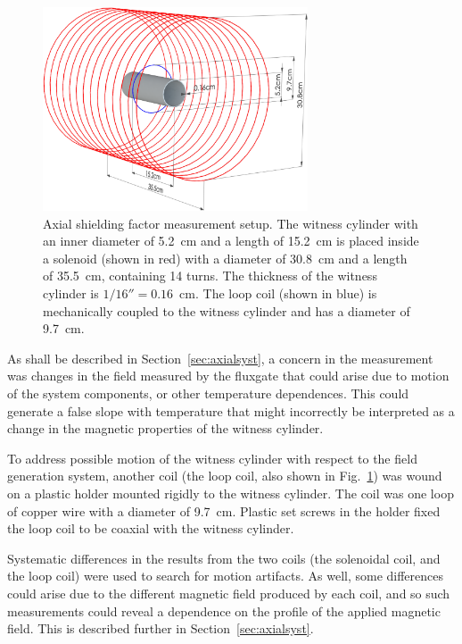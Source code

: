 \begin{figure}
  \begin{center}
    \includegraphics[width=0.7\textwidth]{to_jeff_new4.pdf}
    \caption[Drawing of the axial shielding factor measurement setup
    ]{Axial shielding factor measurement setup. The witness cylinder
      with an inner diameter of 5.2~cm and a length of 15.2~cm is
      placed inside a solenoid (shown in red) with a diameter of
      30.8~cm and a length of 35.5~cm, containing 14 turns.  The
      thickness of the witness cylinder is $1/16''=0.16$~cm.  The loop
      coil (shown in blue) is mechanically coupled to the witness
      cylinder and has a diameter of 9.7~cm.}
    \label{fig:geometry}
  \end{center}
\end{figure}

As shall be described in Section~\ref{sec:axialsyst}, a concern in the
measurement was changes in the field measured by the fluxgate that
could arise due to motion of the system components, or other
temperature dependences. This could generate a false slope with
temperature that might incorrectly be interpreted as a change in the
magnetic properties of the witness cylinder.

To address possible motion of the witness cylinder with respect to the
field generation system, another coil (the loop coil, also shown in
Fig.~\ref{fig:geometry}) was wound on a plastic holder mounted rigidly
to the witness cylinder.  The coil was one loop of copper wire with a
diameter of 9.7~cm.  Plastic set screws in the holder fixed the loop
coil to be coaxial with the witness cylinder.

Systematic differences in the results from the two coils (the
solenoidal coil, and the loop coil) were used to search for motion
artifacts.  As well, some differences could arise due to the different
magnetic field produced by each coil, and so such measurements could
reveal a dependence on the profile of the applied magnetic field.
This is described further in Section~\ref{sec:axialsyst}.

